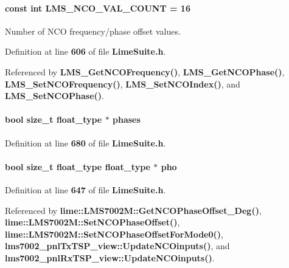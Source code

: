 \paragraph[{L\+M\+S\+\_\+\+N\+C\+O\+\_\+\+V\+A\+L\+\_\+\+C\+O\+U\+NT}]{\setlength{\rightskip}{0pt plus 5cm}const {\bf int} L\+M\+S\+\_\+\+N\+C\+O\+\_\+\+V\+A\+L\+\_\+\+C\+O\+U\+NT = 16\hspace{0.3cm}{\ttfamily [static]}}\label{group__FN__ADVANCED_ga331504c4d15acccb359a9254601487b6}


Number of N\+CO frequency/phase offset values. 



Definition at line {\bf 606} of file {\bf Lime\+Suite.\+h}.



Referenced by {\bf L\+M\+S\+\_\+\+Get\+N\+C\+O\+Frequency()}, {\bf L\+M\+S\+\_\+\+Get\+N\+C\+O\+Phase()}, {\bf L\+M\+S\+\_\+\+Set\+N\+C\+O\+Frequency()}, {\bf L\+M\+S\+\_\+\+Set\+N\+C\+O\+Index()}, and {\bf L\+M\+S\+\_\+\+Set\+N\+C\+O\+Phase()}.

\paragraph[{phases}]{\setlength{\rightskip}{0pt plus 5cm}bool size\+\_\+t {\bf float\+\_\+type} $\ast$ phases}\label{group__FN__ADVANCED_ga7063a3c750acb78340bfe9352c26276e}


Definition at line {\bf 680} of file {\bf Lime\+Suite.\+h}.

\paragraph[{pho}]{\setlength{\rightskip}{0pt plus 5cm}bool size\+\_\+t {\bf float\+\_\+type} {\bf float\+\_\+type} $\ast$ pho}\label{group__FN__ADVANCED_gada94a93222605c574a9197b8acfe35b1}


Definition at line {\bf 647} of file {\bf Lime\+Suite.\+h}.



Referenced by {\bf lime\+::\+L\+M\+S7002\+M\+::\+Get\+N\+C\+O\+Phase\+Offset\+\_\+\+Deg()}, {\bf lime\+::\+L\+M\+S7002\+M\+::\+Set\+N\+C\+O\+Phase\+Offset()}, {\bf lime\+::\+L\+M\+S7002\+M\+::\+Set\+N\+C\+O\+Phase\+Offset\+For\+Mode0()}, {\bf lms7002\+\_\+pnl\+Tx\+T\+S\+P\+\_\+view\+::\+Update\+N\+C\+Oinputs()}, and {\bf lms7002\+\_\+pnl\+Rx\+T\+S\+P\+\_\+view\+::\+Update\+N\+C\+Oinputs()}.

